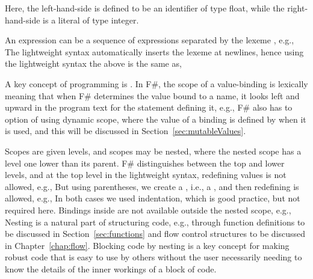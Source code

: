 %
%
%
Here, the left-hand-side is defined to be an identifier of type float, while the right-hand-side is a literal of type integer.

An expression can be a sequence of expressions separated by the lexeme \lexeme{;}, e.g.,
%
%
The lightweight syntax automatically inserts the \lexeme{;} lexeme at newlines, hence using the lightweight syntax the above is the same as,
%
%

A key concept of programming is . In F\#, the scope of a value-binding is lexically meaning that when F\# determines the value bound to a name, it looks left and upward in the program text for the  statement defining it, e.g.,
%
%
F\# also has to option of using dynamic scope, where the value of a binding is defined by when it is used, and this will be discussed in Section~\ref{sec:mutableValues}.

Scopes are given levels, and scopes may be nested, where the nested scope has a level one lower than its parent. F\# distinguishes between the top and lower levels, and at the top level in the lightweight syntax, redefining values is not allowed, e.g.,
%
%
But using parentheses, we create a , i.e., a , and then redefining is allowed, e.g.,
%
%
In both cases we used indentation, which is good practice, but not required here. Bindings inside are not available outside the nested scope, e.g.,
%
%
Nesting is a natural part of structuring code, e.g., through function definitions to be discussed in Section~\ref{sec:functions} and flow control structures to be discussed in Chapter~\ref{chap:flow}. Blocking code by nesting is a key concept for making robust code that is easy to use by others without the user necessarily needing to know the details of the inner workings of a block of code.

